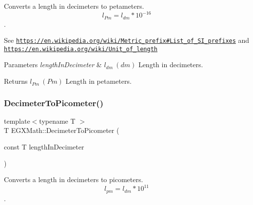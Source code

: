 Converts a length in decimeters to petameters. \[ l_{Pm}=l_{dm} * 10^{-16} \]. 

See \href{https://en.wikipedia.org/wiki/Metric_prefix#List_of_SI_prefixes}{\tt https\+://en.\+wikipedia.\+org/wiki/\+Metric\+\_\+prefix\#\+List\+\_\+of\+\_\+\+S\+I\+\_\+prefixes} and \href{https://en.wikipedia.org/wiki/Unit_of_length}{\tt https\+://en.\+wikipedia.\+org/wiki/\+Unit\+\_\+of\+\_\+length} 
\begin{DoxyParams}{Parameters}
{\em length\+In\+Decimeter} & $ l_{dm}\ (dm)$ Length in decimeters. \\
\hline
\end{DoxyParams}
\begin{DoxyReturn}{Returns}
$ l_{Pm}\ (Pm)$ Length in petameters. 
\end{DoxyReturn}
\mbox{\label{group___e_g_x_math-_conversions-_length_conversions-_s_i-_decimeter-_s_i_gaac5fa4b7b538abe2d19f33e131e9bbde}} 
\subsubsection{\texorpdfstring{Decimeter\+To\+Picometer()}{DecimeterToPicometer()}}
{\footnotesize\ttfamily template$<$typename T $>$ \\
T E\+G\+X\+Math\+::\+Decimeter\+To\+Picometer (\begin{DoxyParamCaption}\item[{const T}]{length\+In\+Decimeter }\end{DoxyParamCaption})}



Converts a length in decimeters to picometers. \[ l_{pm}=l_{dm} * 10^{11} \]. 

